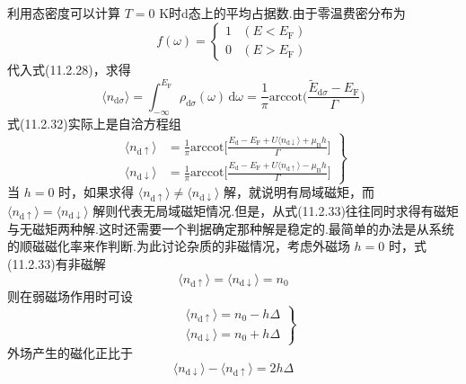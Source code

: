 利用态密度可以计算 $T=0$ K时d态上的平均占据数.由于零温费密分布为
\begin{equation}
  f(\omega)=\begin{cases}1&(E<E_{\mathrm{F}})\\0&(E>E_{\mathrm{F}})\end{cases}
\end{equation}
代入式(11.2.28)，求得
\begin{equation}
  \langle n_{\mathrm{d}\sigma}\rangle
  =\int_{-\infty}^{E_{\mathrm{F}}}\rho_{\mathrm{d}\sigma}(\omega)\,\mathrm{d}\omega
  =\frac{1}{\pi}\mathrm{arccot}
  \biggl(\frac{\tilde{E}_{\mathrm{d}\sigma}-E_{\mathrm{F}}}{\Gamma}\biggr)
\end{equation}
式(11.2.32)实际上是自洽方程组
\begin{equation}
\left.
\begin{aligned}
  \langle n_{\mathrm{d}\uparrow}\rangle
  &=\frac{1}{\pi}\mathrm{arccot}
  \biggl[\frac{E_{\mathrm{d}}-E_{\mathrm{F}}
  +U\langle n_{\mathrm{d}\downarrow}\rangle+\mu_{\mathrm{B}}h}{\Gamma}\biggr]\\
  \langle n_{\mathrm{d}\downarrow}\rangle
  &=\frac{1}{\pi}\mathrm{arccot}
  \biggl[\frac{E_{\mathrm{d}}-E_{\mathrm{F}}
  +U\langle n_{\mathrm{d}\uparrow}\rangle-\mu_{\mathrm{B}}h}{\Gamma}\biggr]
\end{aligned}\right\}
\end{equation}
当 $h=0$ 时，如果求得 $\langle n_{\mathrm{d}\uparrow}\rangle\neq\langle n_{\mathrm{d}\downarrow}\rangle$ 解，就说明有局域磁矩，而 $\langle n_{\mathrm{d}\uparrow}\rangle=\langle n_{\mathrm{d}\downarrow}\rangle$ 解则代表无局域磁矩情况.但是，从式(11.2.33)往往同时求得有磁矩与无磁矩两种解.这时还需要一个判据确定那种解是稳定的.最简单的办法是从系统的顺磁磁化率来作判断.为此讨论杂质的非磁情况，考虑外磁场 $h=0$ 时，式(11.2.33)有非磁解
\begin{equation}
  \langle n_{\mathrm{d}\uparrow}\rangle
  =\langle n_{\mathrm{d}\downarrow}\rangle=n_{0}
\end{equation}
则在弱磁场作用时可设
\begin{equation}
\left.
\begin{aligned}
  &\langle n_{\mathrm{d}\uparrow}\rangle=n_{0}-h\Delta\\
  &\langle n_{\mathrm{d}\downarrow}\rangle=n_{0}+h\Delta
\end{aligned}\right\}
\end{equation}
外场产生的磁化正比于
\begin{equation}
  \langle n_{\mathrm{d}\downarrow}\rangle
  -\langle n_{\mathrm{d}\uparrow}\rangle=2h\Delta
\end{equation}
